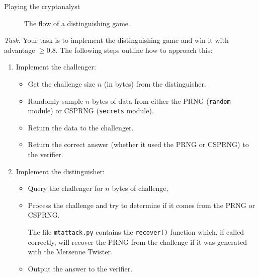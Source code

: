 \documentclass{practice}
\begin{document}
\begin{task}{Playing the cryptanalyst}
\begin{figure}[h!]
    \caption{The flow of a distinguishing game.}
    \label{fig:distinguishing}
  \end{figure}

  \textit{Task.}
  Your task is to implement the distinguishing game and win it with advantage $\ge 0.8$.
  The following steps outline how to approach this:
  \begin{enumerate}
    \item Implement the challenger:
    \begin{itemize}
      \item Get the challenge size $n$ (in bytes) from the distinguisher.
      \item Randomly sample $n$ bytes of data from either the PRNG (\texttt{random} module) or CSPRNG (\texttt{secrets} module).
      \item Return the data to the challenger.
      \item Return the correct answer (whether it used the PRNG or CSPRNG) to the verifier.
    \end{itemize}
    
    \item Implement the distinguisher:
    \begin{itemize}
      \item Query the challenger for $n$ bytes of challenge,
      \item Process the challenge and try to determine if it comes from the PRNG or CSPRNG.
      
      The file \texttt{mtattack.py} contains the \texttt{recover()} function which, if called correctly, will recover the PRNG from the challenge if it was generated with the Mersenne Twister.
      \item Output the answer to the verifier.
    \end{itemize}


\end{enumerate}
\end{task}
\end{document}
